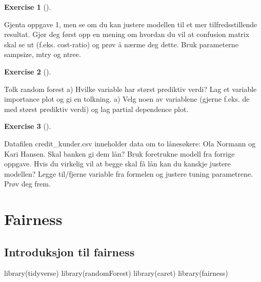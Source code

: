 \documentclass[
  letterpaper,
  DIV=11,
  numbers=noendperiod]{scrreprt}
\newenvironment{Shaded}{\begin{snugshade}}{\end{snugshade}}
\newcommand{\FunctionTok}[1]{\textcolor[rgb]{0.28,0.35,0.67}{#1}}
\newcommand{\NormalTok}[1]{\textcolor[rgb]{0.00,0.23,0.31}{#1}}
\theoremstyle{definition}
\newtheorem{exercise}{Exercise}[chapter]
\theoremstyle{remark}
\begin{document}
\leavevmode{}%
\begin{exercise}[]\label{exr-}

Gjenta oppgave 1, men se om du kan justere modellen til et mer
tilfredsstillende resultat. Gjør deg først opp en mening om hvordan du
vil at confusion matrix skal se ut (f.eks. cost-ratio) og prøv å nærme
deg dette. Bruk parameterne sampsize, mtry og ntree.

\end{exercise}

\leavevmode{}%
\begin{exercise}[]\label{exr-}

Tolk random forest a) Hvilke variable har størst prediktiv verdi? Lag et
variable importance plot og gi en tolkning. a) Velg noen av variablene
(gjerne f.eks. de med størst prediktiv verdi) og lag partial dependence
plot.

\end{exercise}

\leavevmode{}%
\begin{exercise}[]\label{exr-}

Datafilen credit\_kunder.csv inneholder data om to lånesøkere: Ola
Normann og Kari Hansen. Skal banken gi dem lån? Bruk foretrukne modell
fra forrige oppgave. Hvis du virkelig vil at begge skal få lån kan du
kanskje justere modellen? Legge til/fjerne variable fra formelen og
justere tuning parametrene. Prøv deg frem.

\end{exercise}


\hypertarget{fairness}{%
\chapter{Fairness}\label{fairness}}

\hypertarget{introduksjon-til-fairness}{%
\section{Introduksjon til fairness}\label{introduksjon-til-fairness}}

\begin{Shaded}
\begin{Highlighting}[]
\FunctionTok{library}\NormalTok{(tidyverse)}
\FunctionTok{library}\NormalTok{(randomForest)}
\FunctionTok{library}\NormalTok{(caret)}
\FunctionTok{library}\NormalTok{(fairness)}
\end{Highlighting}
\end{Shaded}
\end{document}
